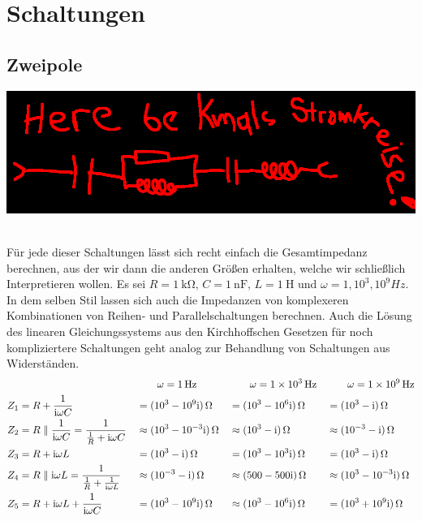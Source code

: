 \section{Schaltungen}
\subsection{Zweipole}
\begin{center}\includegraphics[width=.6\textwidth]{placeholder.png}\end{center}~\\
%
%
Für jede dieser Schaltungen lässt sich recht einfach die Gesamtimpedanz berechnen, aus der wir dann
die anderen Größen erhalten, welche wir schließlich Interpretieren wollen.
Es sei $R=\SI{1}{\kilo\ohm},\, C=\SI{1}{\nano\farad},\, L=\SI{1}{\henry}$ und $\omega = 1,10^3,10^{9} \si{Hz}$.
In dem selben Stil lassen sich auch die Impedanzen von komplexeren Kombinationen
von Reihen- und Parallelschaltungen berechnen. Auch die Lösung des linearen Gleichungssystems aus den Kirchhoffschen Gesetzen für noch kompliziertere Schaltungen geht analog zur Behandlung von Schaltungen aus Widerständen.
\begin{align*}
    && &\qquad \omega = \SI{1}{\Hz} &&\qquad \omega = \SI{1e3}{\Hz} &&\qquad \omega = \SI{1e9}{\Hz} \\
    Z_1 &= R + \ic 
    &&= (10^3 - 10^9 \imu)\,\si{\ohm} &&=(10^3 - 10^6 \imu)\,\si{\ohm} &&=(10^3 - \imu)\,\si{\ohm} \\
    Z_2 &= R \parallel \ic = \frac{1}{\frac{1}{R} + \imu \omega C}
    &&\approx (10^3 - 10^{-3} \imu)\,\si{\ohm} &&\approx(10^3 - \imu)\,\si{\ohm} &&\approx(10^{-3} - \imu)\,\si{\ohm} \\
    Z_3 &= R + \il 
    &&= (10^3 - \imu)\,\si{\ohm} &&=(10^3 - 10^3 \imu)\,\si{\ohm} &&=(10^3 - \imu)\,\si{\ohm} \\
    Z_4 &= R \parallel \il = \frac{1}{\frac{1}{R} + \frac{1}{\il}} 
    &&\approx (10^{-3} - \imu)\,\si{\ohm} &&\approx(500 - 500 \imu)\,\si{\ohm} &&\approx(10^3 - 10^{-3}\imu)\,\si{\ohm} \\
    Z_5 &= R + \il + \ic 
    &&= (10^3 - 10^9\imu)\,\si{\ohm} &&\approx(10^3 - 10^6 \imu)\,\si{\ohm} &&=(10^3 + 10^9\imu)\,\si{\ohm} 
\end{align*}
